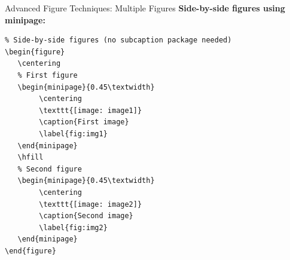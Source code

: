 \begin{frame}[fragile]{Advanced Figure Techniques: Multiple Figures}
     \textbf{Side-by-side figures using minipage:}
     \begin{lstlisting}
% Side-by-side figures (no subcaption package needed)
\begin{figure}
   \centering
   % First figure
   \begin{minipage}{0.45\textwidth}
        \centering
        \texttt{[image: image1]}
        \caption{First image}
        \label{fig:img1}
   \end{minipage}
   \hfill
   % Second figure
   \begin{minipage}{0.45\textwidth}
        \centering
        \texttt{[image: image2]}
        \caption{Second image}
        \label{fig:img2}
   \end{minipage}
\end{figure}
     \end{lstlisting}
\end{frame}

